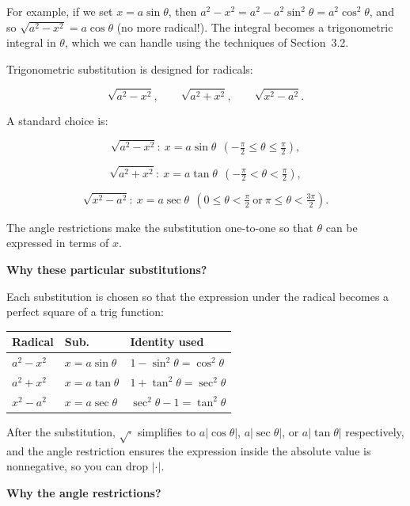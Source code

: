 For example, if we set $x=a\sin\theta$, then $a^2-x^2=a^2-a^2\sin^2\theta=a^2\cos^2\theta$, and so $\sqrt{a^2-x^2}=a\cos\theta$ (no more radical!). The integral becomes a trigonometric integral in $\theta$, which we can handle using the techniques of Section~3.2.

\begin{keyformula}[title={Key Formula: Trigonometric substitution table}]

Trigonometric substitution is designed for radicals:

\[
\sqrt{a^2-x^2},\qquad \sqrt{a^2+x^2},\qquad \sqrt{x^2-a^2}.
\]

A standard choice is:

\[
\sqrt{a^2-x^2}: \ x=a\sin\theta \ \ (-\tfrac{\pi}{2}\le\theta\le\tfrac{\pi}{2}),
\]

\[
\sqrt{a^2+x^2}: \ x=a\tan\theta \ \ (-\tfrac{\pi}{2}<\theta<\tfrac{\pi}{2}),
\]

\[
\sqrt{x^2-a^2}: \ x=a\sec\theta \ \ (0\le\theta<\tfrac{\pi}{2}\ \text{or}\ \pi\le\theta<\tfrac{3\pi}{2}).
\]

The angle restrictions make the substitution one-to-one so that $\theta$ can be expressed in terms of $x$.

\end{keyformula}

\textbf{Why these particular substitutions?}

Each substitution is chosen so that the expression under the radical becomes a perfect square of a trig function:

\begin{center}
\begin{tabular}{lll}
\textbf{Radical} & \textbf{Sub.} & \textbf{Identity used} \\
\hline
$a^2-x^2$ & $x=a\sin\theta$ & $1-\sin^2\theta=\cos^2\theta$ \\
$a^2+x^2$ & $x=a\tan\theta$ & $1+\tan^2\theta=\sec^2\theta$ \\
$x^2-a^2$ & $x=a\sec\theta$ & $\sec^2\theta-1=\tan^2\theta$ \\
\end{tabular}
\end{center}

After the substitution, $\sqrt{\cdot}$ simplifies to $a|\cos\theta|$, $a|\sec\theta|$, or $a|\tan\theta|$ respectively, and the angle restriction ensures the expression inside the absolute value is nonneg\-ative, so you can drop $|\cdot|$.

\textbf{Why the angle restrictions?}

